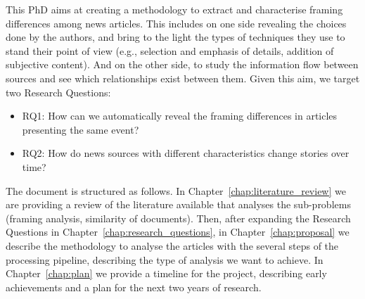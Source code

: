 
This PhD aims at creating a methodology to extract and characterise framing differences among news articles.
This includes on one side revealing the choices done by the authors, and bring to the light the types of techniques they use to stand their point of view (e.g., selection and emphasis of details, addition of subjective content).
And on the other side, to study the information flow between sources and see which relationships exist between them. %
Given this aim, we target two Research Questions:

\begin{itemize}
    \item RQ1: How can we automatically reveal the framing differences in articles presenting the same event?
    \item RQ2: How do news sources with different characteristics change stories over time?
\end{itemize}









The document is structured as follows.
In Chapter~\ref{chap:literature_review} we are providing a review of the literature available that analyses the sub-problems (framing analysis, similarity of documents).
Then, after expanding the Research Questions in Chapter~\ref{chap:research_questions}, in Chapter~\ref{chap:proposal} we describe the methodology to analyse the articles with the several steps of the processing pipeline, describing the type of analysis we want to achieve.
In Chapter~\ref{chap:plan} we provide a timeline for the project, describing early achievements and a plan for the next two years of research.


